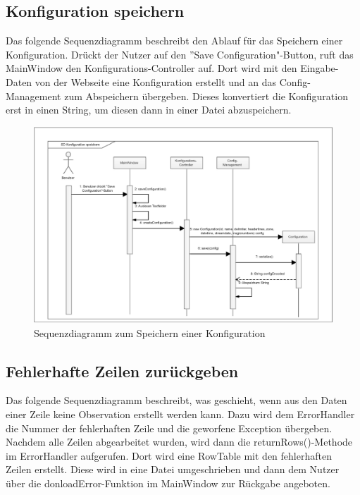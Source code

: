 \subsection{Konfiguration speichern}
Das folgende Sequenzdiagramm beschreibt den Ablauf für das Speichern einer Konfiguration.
Drückt der Nutzer auf den ”{Save Configuration}"{-Button}, ruft das MainWindow den Konfigurations-Controller auf.
Dort wird mit den Eingabe-Daten von der Webseite eine Konfiguration erstellt und an das Config-Management zum Abspeichern übergeben.
Dieses konvertiert die Konfiguration erst in einen String, um diesen dann in einer Datei abzuspeichern.
\vspace{\fill}
\begin{figure}[htbp]
\centering
\includegraphics[scale=0.5]{uml/SD_saveConfig.eps}
\caption{Sequenzdiagramm zum Speichern einer Konfiguration}
\end{figure}

\vspace{\fill}
\clearpage
\subsection{Fehlerhafte Zeilen zurückgeben}
Das folgende Sequenzdiagramm beschreibt, was geschieht, wenn aus den Daten einer Zeile keine Observation erstellt werden kann.
Dazu wird dem ErrorHandler die Nummer der fehlerhaften Zeile und die geworfene Exception übergeben.
Nachdem alle Zeilen abgearbeitet wurden, wird dann die returnRows()-Methode im ErrorHandler aufgerufen.
Dort wird eine RowTable mit den fehlerhaften Zeilen erstellt.
Diese wird in eine Datei umgeschrieben und dann dem Nutzer über die donloadError-Funktion im MainWindow zur Rückgabe angeboten.

